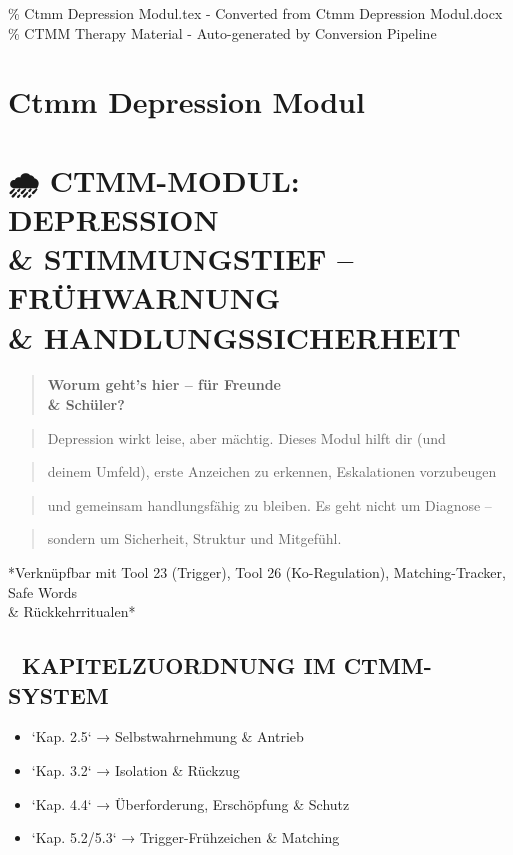 \% Ctmm Depression Modul.tex - Converted from Ctmm Depression Modul.docx
\% CTMM Therapy Material - Auto-generated by Conversion Pipeline

\section{Ctmm Depression Modul}
\label{sec:ctmm-depression-modul}

\section{🌧️ \textcolor{ctmmBlue}{CTMM}-MODUL: DEPRESSION \\& STIMMUNGSTIEF -- FRÜHWARNUNG \\& HANDLUNGSSICHERHEIT}

\begin{quote}
\textcolor{ctmmPurple}{\faBrain} \textbf{Worum geht's hier -- für Freunde \\& Schüler?}\
\end{quote}
\begin{quote}
Depression wirkt leise, aber mächtig. Dieses Modul hilft dir (und
\end{quote}
\begin{quote}
deinem Umfeld), erste Anzeichen zu erkennen, Eskalationen vorzubeugen
\end{quote}
\begin{quote}
und gemeinsam handlungsfähig zu bleiben. Es geht nicht um Diagnose --
\end{quote}
\begin{quote}
sondern um Sicherheit, Struktur und Mitgefühl.
\end{quote}

\textcolor{ctmmBlue}{\faPuzzlePiece} *Verknüpfbar mit Tool 23 (\textcolor{ctmmRed}{Trigger}), Tool 26 (Ko-Regulation),
Matching-Tracker, Safe Words \\& Rückkehrritualen*

\subsection{📘 KAPITELZUORDNUNG IM \textcolor{ctmmBlue}{CTMM}-SYSTEM}

\begin{itemize}
\item   `Kap. 2.5` → Selbstwahrnehmung \& Antrieb
\item   `Kap. 3.2` → Isolation \& Rückzug
\item   `Kap. 4.4` → Überforderung, Erschöpfung \& Schutz
\item   `Kap. 5.2/5.3` → Trigger-Frühzeichen \& Matching
\end{itemize}

